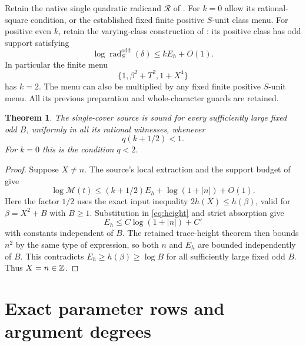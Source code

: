 \documentclass[11pt,a4paper]{article}
\newtheorem{theorem}{Theorem}[section]
\begin{document}
Retain the native single quadratic radicand $\mathcal R$ of
\cite{Single}. For $k=0$ allow its rational-square condition, or
the established fixed finite positive $S$-unit class menu. For
positive even $k$, retain the varying-class construction of
\cite{Classes}: its positive class has odd support satisfying
\[
 \log\operatorname{rad}_{S}^{\mathrm{odd}}(\delta)
       \le k E_h+O(1).
\]
In particular the finite menu
\[
 \{1,\beta^2+T^2,1+X^4\}
\]
has $k=2$. The menu can also be multiplied by any fixed finite
positive $S$-unit menu. All its previous preparation and
whole-character guards are retained.

\begin{theorem}\label{thm:sound}
The single-cover source is sound for every sufficiently large fixed
odd $B$, uniformly in all its rational witnesses, whenever
\begin{equation}\label{eq:absorption}
 q(k+1/2)<1.
\end{equation}
For $k=0$ this is the condition $q<2$.
\end{theorem}
\begin{proof}
Suppose $X\ne n$. The source's local extraction and the support
budget of \cite{Classes} give
\[
 \log\mathcal M(t)
 \le(k+1/2)E_h+\log(1+|n|)+O(1).
\]
Here the factor $1/2$ uses the exact input inequality
$2h(X)\le h(\beta)$, valid for $\beta=X^2+B$ with $B\ge1$.
Substitution in \eqref{eq:height} and strict absorption give
\[
 E_h\le C\log(1+|n|)+C'
\]
with constants independent of $B$. The retained trace-height theorem
then bounds $n^2$ by the same type of expression, so both $n$ and
$E_h$ are bounded independently of $B$. This contradicts
$E_h\ge h(\beta)\ge\log B$ for all sufficiently large fixed
odd $B$. Thus $X=n\in\mathbb Z$.
\end{proof}

\section{Exact parameter rows and argument degrees}
\end{document}
